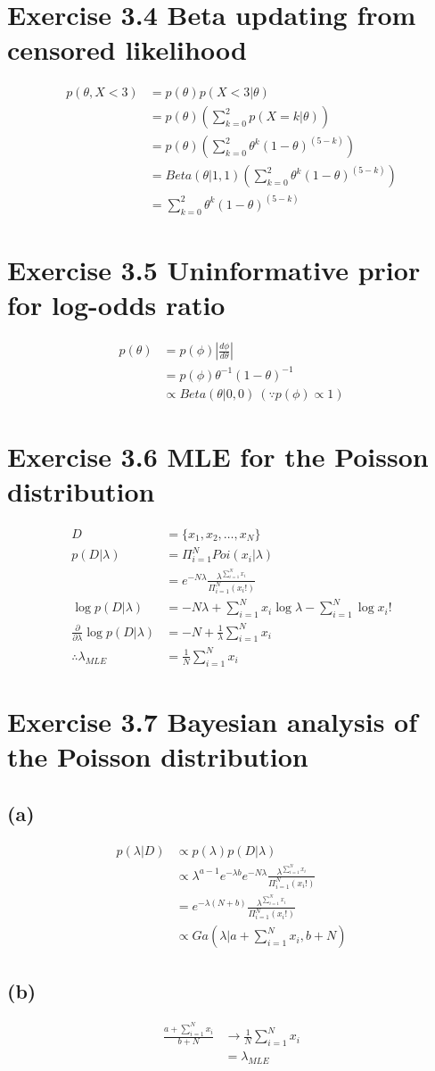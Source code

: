 \documentclass{jsarticle}
\begin{document}
\section*{Exercise 3.4 Beta updating from censored likelihood}
\begin{align}
p(\theta,X<3) & = p(\theta)p(X<3|\theta)\\
& = p(\theta)(\sum_{k=0}^{2}p(X=k|\theta))\\
& = p(\theta)(\sum_{k=0}^{2}\theta^k(1-\theta)^{(5-k)})\\
& = Beta(\theta|1,1)(\sum_{k=0}^{2}\theta^k(1-\theta)^{(5-k)})\\
& = \sum_{k=0}^{2}\theta^k(1-\theta)^{(5-k)}
\end{align}

\section*{Exercise 3.5 Uninformative prior for log-odds ratio}
\begin{align}
p(\theta) & = p(\phi)|\frac{d\phi}{d\theta}|\\
& = p(\phi)\theta^{-1}(1-\theta)^{-1}\\
& \propto Beta(\theta|0,0)\ (\because p(\phi)\propto 1)
\end{align}

\section*{Exercise 3.6 MLE for the Poisson distribution}
\begin{align}
D & = \{x_1, x_2, \dots, x_N\}\\
p(D|\lambda) & = \Pi_{i=1}^{N}Poi(x_i|\lambda)\\
& = e^{-N\lambda}\frac{\lambda^{\sum_{i=1}^{N}x_i}}{\Pi_{i=1}^{N}(x_i!)}\\
\log p(D|\lambda) & = -N\lambda + \sum_{i=1}^{N}x_i\log \lambda - \sum_{i=1}^{N}\log x_i!\\
\frac{\partial}{\partial \lambda}\log p(D|\lambda) & = -N + \frac{1}{\lambda}\sum_{i=1}^{N}x_i\\
\therefore\lambda_{MLE} & =\frac{1}{N}\sum_{i=1}^{N}x_i
\end{align}

\section*{Exercise 3.7 Bayesian analysis of the Poisson distribution}
\subsection*{(a)}
\begin{align}
p(\lambda|D) & \propto p(\lambda)p(D|\lambda)\\
& \propto \lambda^{a-1}e^{-\lambda b}e^{-N\lambda}\frac{\lambda^{\sum_{i=1}^{N}x_i}}{\Pi_{i=1}^{N}(x_i!)}\\
& = e^{-\lambda(N+b)}\frac{\lambda^{\sum_{i=1}^{N}x_i}}{\Pi_{i=1}^{N}(x_i!)}\\
& \propto Ga(\lambda|a + \sum_{i=1}^{N}x_i, b + N)
\end{align}
\subsection*{(b)}
\begin{align}
\frac{a+\sum_{i=1}^{N}x_i}{b+N} & \rightarrow \frac{1}{N}\sum_{i=1}^{N}x_i\\
& = \lambda_{MLE}
\end{align}
\end{document}
